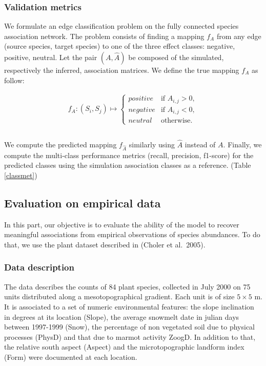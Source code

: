 \documentclass[]{article}
\begin{document}
\subsubsection{Validation metrics}
We formulate an edge classification problem on the fully connected species association network. The problem consists of finding a mapping $f_A$ from any edge (source species, target species) to one of the three effect classes: negative, positive, neutral. Let the pair $(A,\hat{A})$ be composed of the simulated, respectively the inferred, association matrices. We define the true mapping $f_A$ as follow:

\begin{equation*}
\begin{matrix}
f_A : (S_i,S_j) \mapsto  \left\{
\begin{array}{ll}
positive & \mbox{if } A_{i,j}>0, \\
negative & \mbox{if } A_{i,j}<0, \\
neutral & \mbox{otherwise.}
\end{array}
\right.\\\\
\end{matrix}
\end{equation*}

We compute the predicted mapping $f_{\hat{A}}$ similarly using $\hat{A}$ instead of $A$. Finally, we compute the multi-class performance metrics (recall, precision, f1-score) for the predicted classes using the simulation association classes as a reference. (Table \ref{classmet})   

\subsection{Evaluation on empirical data}
In this part, our objective is to evaluate the ability of the model to recover meaningful associations from empirical observations of species abundances. To do that, we use the plant dataset described in (Choler et al.\ 2005). 
\subsubsection{Data description}
The data describes the counts of 84 plant species, collected in July 2000 on 75 units distributed along a mesotopographical gradient. Each unit is of size $5 \times 5 $ m. It is associated to a set of numeric environmental features: the slope inclination in degrees at its location (Slope), the average snowmelt date in julian days between 1997-1999 (Snow), the percentage of non vegetated soil due to physical processes (PhysD) and that due to marmot activity ZoogD. In addition to that, the relative south aspect (Aspect) and the microtopographic landform index (Form) were documented at each location.
\end{document}
